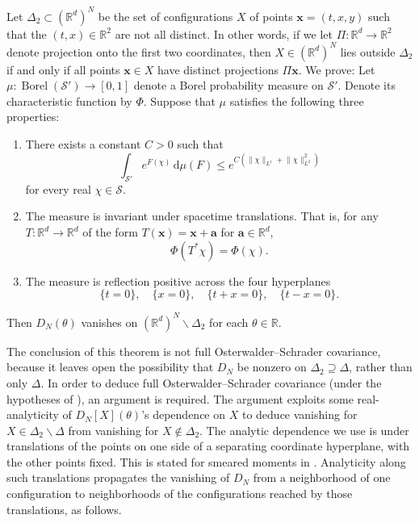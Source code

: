\documentclass[11pt, letterpaper, reqno]{amsart}
\theoremstyle{definition}
\newenvironment{theorem}
{\pushQED{\qed}\renewcommand{\qedsymbol}{$\blacksquare\square$}\theoremxx}
{\popQED\endtheoremxx}
\theoremstyle{remark}
\newcommand{\bbR}{\mathbb{R}}
\newcommand{\calS}{\mathcal{S}}
\newcommand{\bfa}{\mathbf{a}}
\newcommand{\bfx}{\mathbf{x}}
\newcommand{\dd}{\,\mathrm{d}}
\begin{document}
Let $\Delta_2\subset (\bbR^d)^N$ be the set of configurations $X$ of points $\bfx=(t,x,y)$ such that the $(t,x)\in \bbR^2$ are not all distinct. In other words, if we let $\Pi:\bbR^d\to \bbR^2$ denote projection onto the first two coordinates, then $X\in (\bbR^d)^N$ lies outside $\Delta_2$ if and only if all points $\bfx\in X$ have distinct projections $\Pi \bfx$. 
We prove:
\begin{theorem}\label{thm:weak}
    Let $\mu:\operatorname{Borel}(\calS')\to [0,1]$ denote a Borel probability measure on $\calS'$. Denote its characteristic function by $\Phi$. Suppose that $\mu$ satisfies the following three properties:
    \begin{enumerate}[label=(\roman*)]
        \item  There exists a constant $C>0$ such that 
    \begin{equation}
        \int_{\calS'} e^{F(\chi)} \dd \mu(F) \leq e^{C(\lVert\chi\rVert_{L^1}+\lVert\chi\rVert_{L^2}^2)}
    \end{equation}
    for every real $\chi\in\calS$. 
    \item  
    The measure is invariant under spacetime translations. That is, for any $T:\bbR^d\to \bbR^d$ of the form $T(\bfx)=\bfx+\bfa$ for $\bfa\in \bbR^d$, 
    \begin{equation}
        \Phi(T^* \chi) = \Phi(\chi). 
    \end{equation}
    \item
    The measure is reflection positive across the four hyperplanes 
    \begin{equation}
        \{t=0\},\quad \{x=0\},\quad \{t+x=0\},\quad \{t-x=0\}.
    \end{equation}
    \end{enumerate}
    Then $D_N(\theta)$ vanishes on $(\bbR^d)^N\backslash \Delta_2$ for each $\theta\in \bbR$. 
\end{theorem}


The conclusion of this theorem is not full Osterwalder--Schrader covariance, because it leaves open the possibility that $D_N$ be nonzero on $\Delta_2\supseteq \Delta $, rather than only $\Delta$. 
In order to deduce full Osterwalder--Schrader covariance (under the hypotheses of ), an argument is required.
The argument exploits some real-analyticity of $D_N[X](\theta)$'s dependence on $X$ to deduce vanishing for $X\in \Delta_2\backslash \Delta$ from vanishing for $X\notin \Delta_2$. 
The analytic dependence we use is under translations of the points on
one side of a separating coordinate hyperplane, with the other points
fixed. This is stated for smeared moments in .
Analyticity along such translations propagates the vanishing of $D_N$
from a neighborhood of one configuration to neighborhoods of the
configurations reached by those translations, as follows.
\end{document}
